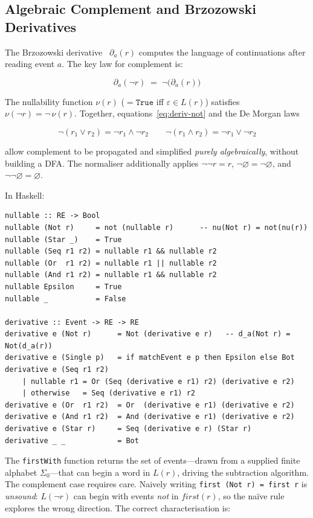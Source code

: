 \documentclass[acmsmall,screen]{acmart}
\newcommand{\univ}{\neg\varnothing}
\begin{document}
\subsection{Algebraic Complement and Brzozowski Derivatives}
\label{sec:deriv}

The Brzozowski derivative~\cite{brzozowski1964} $\partial_a(r)$
computes the language of continuations after reading event $a$.
The key law for complement is:

\begin{equation}
  \partial_a(\neg r) \;=\; \neg\bigl(\partial_a(r)\bigr)
  \label{eq:deriv-not}
\end{equation}

The nullability function $\nu(r)$ ($= \mathtt{True}$ iff
$\varepsilon \in L(r)$) satisfies $\nu(\neg r) = \neg\,\nu(r)$.
Together, equations~\eqref{eq:deriv-not} and the De Morgan laws

\[
  \neg(r_1\vee r_2) = \neg r_1\wedge\neg r_2
  \qquad
  \neg(r_1\wedge r_2) = \neg r_1\vee\neg r_2
\]

allow complement to be propagated and simplified \emph{purely
algebraically}, without building a DFA.
The normaliser additionally applies $\neg\neg r = r$,
$\neg\varnothing = \univ$, and $\neg\univ = \varnothing$.

In Haskell:

\begin{lstlisting}
nullable :: RE -> Bool
nullable (Not r)     = not (nullable r)      -- nu(Not r) = not(nu(r))
nullable (Star _)    = True
nullable (Seq r1 r2) = nullable r1 && nullable r2
nullable (Or  r1 r2) = nullable r1 || nullable r2
nullable (And r1 r2) = nullable r1 && nullable r2
nullable Epsilon     = True
nullable _           = False

derivative :: Event -> RE -> RE
derivative e (Not r)      = Not (derivative e r)   -- d_a(Not r) = Not(d_a(r))
derivative e (Single p)   = if matchEvent e p then Epsilon else Bot
derivative e (Seq r1 r2)
    | nullable r1 = Or (Seq (derivative e r1) r2) (derivative e r2)
    | otherwise   = Seq (derivative e r1) r2
derivative e (Or  r1 r2)  = Or  (derivative e r1) (derivative e r2)
derivative e (And r1 r2)  = And (derivative e r1) (derivative e r2)
derivative e (Star r)     = Seq (derivative e r) (Star r)
derivative _ _            = Bot
\end{lstlisting}

The \lstinline{firstWith} function returns the set of events---drawn from
a supplied finite alphabet $\Sigma_0$---that can begin a word in $L(r)$,
driving the subtraction algorithm.
The complement case requires care.
Naively writing \lstinline{first (Not r) = first r} is \emph{unsound}:
$L(\neg r)$ can begin with events \emph{not} in $\mathit{first}(r)$,
so the na\"ive rule explores the wrong direction.
The correct characterisation is:
\end{document}
